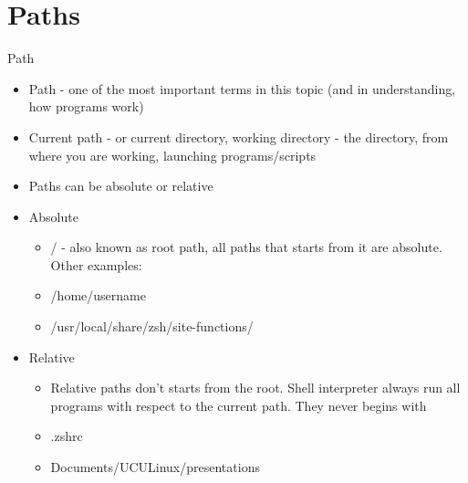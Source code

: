\documentclass[usenames,dvipsnames,10pt,aspectratio=169]{beamer}
\begin{document}
\section{Paths}
\begin{frame}{Path}
    \begin{itemize}
        \item  {\color{ucugreen} Path} - one of the most important terms in this topic (and in understanding, how programs work)
        \item Current path - or current directory, working directory - the directory, from where you are working, launching programs/scripts
        \item Paths can be absolute or relative
        \item Absolute
            \begin{itemize}
                \item {\color{ucugreen} /} - also known as  {\color{ucugreen} root path}, all paths that starts from it are {\color{ucugreen} absolute}. Other examples:
                \item {\color{ucugreen} /home/username}
                \item {\color{ucugreen} /usr/local/share/zsh/site-functions/}
            \end{itemize}
        \item Relative
            \begin{itemize}
                \item Relative paths don't starts from the root. Shell interpreter always run all programs with respect to the current path. They never begins with \ex{/}
                \item {\color{ucugreen} .zshrc}
                \item {\color{ucugreen} Documents/UCULinux/presentations}
            \end{itemize}
    \end{itemize}
\end{frame}
\end{document}
